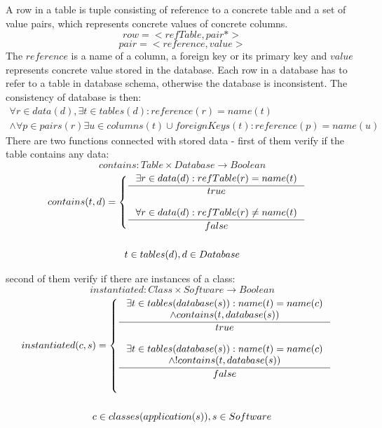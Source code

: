 \documentclass[11pt]{article}
\begin{document}
A row in a table is tuple consisting of reference to a concrete table and a set of value pairs, which represents concrete values of concrete columns.
$$row = < refTable, pair* >$$
$$pair = < reference, value >$$
The $reference $ is a name of a column, a foreign key or its primary key and $value$ represents concrete value stored in the database. Each row in a database has to refer to a table in database schema, otherwise the database is inconsistent. The consistency of database is then:
\begin{equation*}
\begin{gathered}
\forall r \in data(d), \exists t \in tables(d) : reference(r) = name(t) \\ \wedge \forall p \in pairs(r) \exists u \in columns(t) \cup foreignKeys(t) : reference(p) = name(u) 
\end{gathered}
\end{equation*}
There are two functions connected with stored data - first of them verify if the table contains any data:
$$contains : Table \times Database \rightarrow Boolean $$
\begin{equation*}
\begin{gathered}
	contains(t, d) = \begin{cases}
 \inference{\exists r \in data(d) : refTable(r) = name(t) }{true} \\ \\
  \inference{\forall r \in data(d) : refTable(r) \neq name(t)}{false}
 \end{cases} \\ \\
 t \in tables(d), d \in Database
\end{gathered}
\end{equation*}

second of them verify if there are instances of a class:
$$instantiated : Class \times Software \rightarrow Boolean $$ 
\begin{equation*}
\begin{gathered}
	instantiated(c, s) = \begin{cases}
 \inference{\exists t \in tables(database(s)) : name(t) = name(c) \\ \wedge contains(t, database(s))}{true} \\ \\
  \inference{\exists t \in tables(database(s)) : name(t) = name(c) \\ \wedge ! contains(t, database(s))}{false} \\ \\
 \end{cases} \\ \\
 c \in classes(application(s)), s \in Software 
\end{gathered}
\end{equation*}
\end{document}
